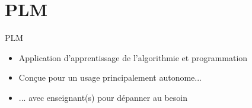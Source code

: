 \section{PLM}

\begin{frame}{PLM}
    \begin{figure}
    \end{figure}
    \vspace{-0.5cm}
    \begin{itemize}
        \item Application d'apprentissage de l'algorithmie et programmation
        \item Conçue pour un usage principalement autonome...
        \item ... avec enseignant(s) pour dépanner au besoin
    \end{itemize}
\end{frame}

